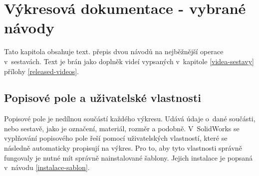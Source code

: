 \chapter{Výkresová dokumentace - vybrané návody}
Tato kapitola obsahuje text. přepis dvou návodů na nejběžnější operace v~sestavách.
Text je brán jako doplněk videí vypsaných v~kapitole \ref{videa-sestavy} přílohy \ref{released-videos}.

\section{Popisové pole a uživatelské vlastnosti}
Popisové pole je nedílnou součástí každého výkresu.
Udává údaje o~dané součásti, nebo sestavě, jako je označení, materiál, rozměr a podobně.
V~SolidWorks se vyplňování popisového pole řeší pomocí uživatelských vlastností, které se následně automaticky propisují na výkres.
Pro to, aby tyto vlastnosti správně fungovaly je nutné mít správně nainstalované šablony.
Jejich instalace je popsaná v~návodu \ref{instalace-sablon}.


